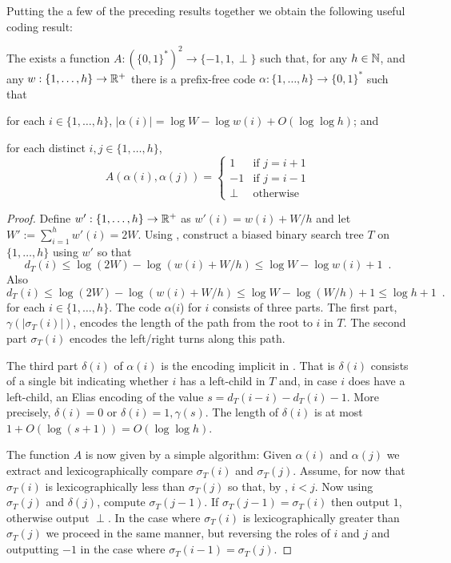 \documentclass[kpfonts]{patmorin}
\begin{document}
Putting the a few of the preceding results together we obtain the following useful coding result:

\begin{lem}
  The exists a function $A:(\{0,1\}^*)^2\to\{-1,1,\perp\}$ such that, for any $h\in\mathbb{N}$, and any $w:\{1,\ldots,h\}\to\mathbb{R}^+$ there is a prefix-free code $\alpha:\{1,\ldots,h\}\to \{0,1\}^*$ such that 
  \begin{compactenum}
    \item for each $i\in\{1,\ldots,h\}$, $|\alpha(i)|=\log W -\log w(i) + O(\log\log h)$; and
    \item for each distinct $i,j\in\{1,\ldots,h\}$, 
    \[   A(\alpha(i),\alpha(j)) 
    = \begin{cases}
       1 & \text{if $j=i+1$} \\
       -1 & \text{if $j=i-1$} \\
       \perp & \text{otherwise}
      \end{cases}
      \]
    \end{compactenum}
\end{lem}


\begin{proof}
  Define $w':\{1,\ldots,h\}\to \mathbb{R}^+$ as $w'(i)=w(i)+W/h$ and let $W':=\sum_{i=1}^h w'(i)=2W$.
  Using , construct a biased binary search tree $T$ on $\{1,\ldots,h\}$ using $w'$ so that 
  \[   
    d_T(i)\le\log (2W)-\log(w(i)+W/h) \le \log W-\log w(i)+1 \enspace .
  \]
  Also
  \[
  d_T(i)\le\log (2W)-\log(w(i)+W/h) \le \log W-\log (W/h)+1 \le \log h + 1\enspace .
  \]
  for each $i\in\{1,\ldots,h\}$.  The code $\alpha(i$) for $i$ consists of three parts.  The first part, $\gamma(|\sigma_T(i)|)$, encodes the length of the path from the root to $i$ in $T$. The second part $\sigma_T(i)$ encodes the left/right turns along this path.  
  
  The third part $\delta(i)$ of $\alpha(i)$ is the encoding implicit in .  That is $\delta(i)$ consists of
  a single bit indicating whether $i$ has a left-child in $T$ and, in case $i$ does have a left-child, an Elias encoding of the value $s=d_T(i-i)-d_T(i)-1$.  More precisely, $\delta(i)=0$ or $\delta(i)=1,\gamma(s)$.  The length of $\delta(i)$ is at most $1+O(\log(s+1))=O(\log\log h)$.

  The function $A$ is now given by a simple algorithm: Given $\alpha(i)$ and $\alpha(j)$ we extract and lexicographically compare $\sigma_T(i)$ and $\sigma_T(j)$.  Assume, for now that $\sigma_T(i)$ is lexicographically less than $\sigma_T(j)$ so that, by , $i < j$.  Now using $\sigma_T(j)$ and $\delta(j)$, compute $\sigma_T(j-1)$.  If $\sigma_T(j-1)=\sigma_T(i)$ then output $1$, otherwise output $\perp$.
  In the case where $\sigma_T(i)$ is lexicographically greater than $\sigma_T(j)$ we proceed in the same manner, but reversing the roles of $i$ and $j$ and outputting $-1$ in the case where $\sigma_T(i-1)=\sigma_T(j)$.
\end{proof}
\end{document}
